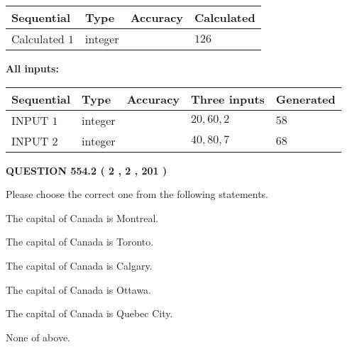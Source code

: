 \documentclass[12pt]{article}
\begin{document}
   
   
   
\noindent{}
   
   
  
  
\noindent\begin{tabular}{|l|l|l|l|}
\hline
 Sequential & Type & Accuracy & Calculated \\ 
\hline
 
 
  Calculated $  1 $ & integer &  & 
  $ 126 $ 
 \\  \hline  
 \end{tabular}
   
   
   
   
\noindent\vspace{0.1in}\hspace{-0.08in} {\textbf{\Large{All inputs: }}}
   
   
  
  
\noindent\begin{tabular}{|l|l|l|l|l|}
\hline
 Sequential & Type & Accuracy & Three inputs & Generated \\ 
\hline
 
 
  INPUT $  1 $ & integer &  & $
 20
 , 
 60
 , 
 2
 $ & $ 58 $ 
 \\  \hline  
 
 
  INPUT $  2 $ & integer &  & $
 40
 , 
 80
 , 
 7
 $ & $ 68 $ 
 \\  \hline  
 \end{tabular}
   
   
  
\vspace{0.2in}
  
{\textbf{\Large{QUESTION
554.2 
 ( 2 , 2 , 201 )
}}}
  
  
Please choose the correct one from the following statements.
 
 
The capital of Canada is Montreal.
 
 
The capital of Canada is Toronto.
 
 
The capital of Canada is Calgary.
 
 
The capital of Canada is Ottawa.
 
 
The capital of Canada is Quebec City.
 
 
 None of above.
 
 
\noindent{}
 
\end{document}
